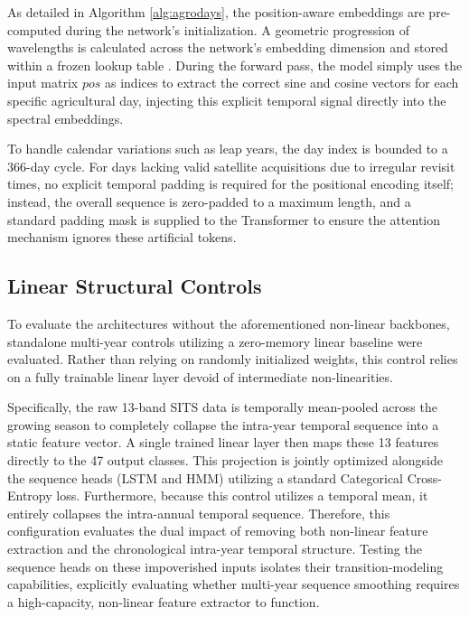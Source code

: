 As detailed in Algorithm \ref{alg:agrodays}, the position-aware embeddings are pre-computed during the network's initialization.
A geometric progression of wavelengths is calculated across the network's embedding dimension and stored within
a frozen lookup table \cite{attention_is_all_you_need}.
During the forward pass, the model simply uses the input matrix $pos$ as indices to extract the correct sine and cosine vectors
for each specific agricultural day, injecting this explicit temporal signal directly into the spectral embeddings.

To handle calendar variations such as leap years, the day index is bounded to a 366-day cycle.
For days lacking valid satellite acquisitions due to irregular revisit times,
no explicit temporal padding is required for the positional encoding itself;
instead, the overall sequence is zero-padded to a maximum length, and a standard padding mask is supplied
to the Transformer to ensure the attention mechanism ignores these artificial tokens.

\subsection{Linear Structural Controls}
\label{subsec:linear_controls}

To evaluate the architectures without the aforementioned non-linear backbones,
standalone multi-year controls utilizing a zero-memory linear baseline were evaluated.
Rather than relying on randomly initialized weights, this control relies on a fully trainable linear layer devoid of intermediate non-linearities.

Specifically, the raw 13-band SITS data is temporally mean-pooled across the growing season to completely
collapse the intra-year temporal sequence into a static feature vector.
A single trained linear layer then maps these 13 features directly to the 47 output classes.
This projection is jointly optimized alongside the sequence heads (LSTM and HMM) utilizing a standard Categorical Cross-Entropy loss.
Furthermore, because this control utilizes a temporal mean, it entirely collapses the intra-annual temporal sequence.
Therefore, this configuration evaluates the dual impact of removing both non-linear feature extraction
and the chronological intra-year temporal structure.
Testing the sequence heads on these impoverished inputs isolates their transition-modeling capabilities,
explicitly evaluating whether multi-year sequence smoothing requires a high-capacity, non-linear feature extractor to function.


